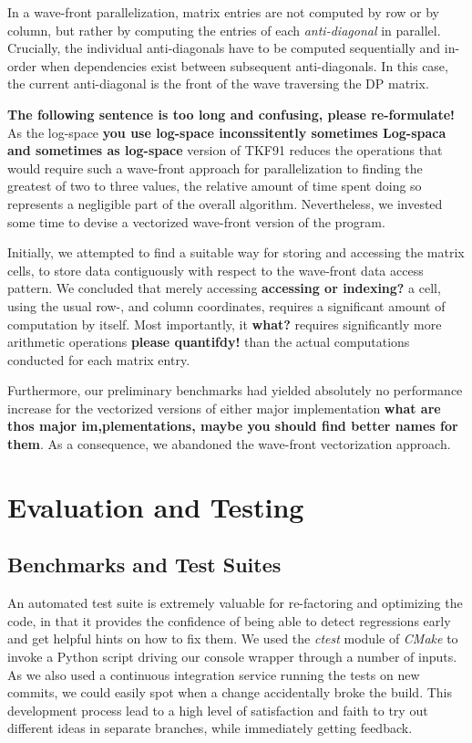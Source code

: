 \documentclass[runningheads,a4paper]{llncs}
\begin{document}
In a wave-front parallelization, matrix entries are not computed by row or by column, but rather by computing the entries of each \textit{anti-diagonal} in parallel. 
Crucially, the individual anti-diagonals have to be computed sequentially and in-order when dependencies exist between subsequent anti-diagonals. 
In this case, the current anti-diagonal is the front of the wave traversing the DP matrix.

{\bf The following sentence is too long and confusing, please re-formulate!} As the log-space {\bf you use log-space inconssitently sometimes Log-spaca and sometimes as log-space} 
version of TKF91 reduces the operations that would require such a wave-front approach for parallelization to finding the greatest of two to three values, 
the relative amount of time spent doing so represents a negligible part of the overall algorithm. 
Nevertheless, we invested some time to devise a vectorized wave-front version of the program.

Initially, we attempted to find a suitable way for storing and accessing the matrix cells, 
to store data contiguously with respect to the wave-front data access pattern. 
We concluded that merely accessing {\bf accessing or indexing?} a cell, using the usual row-, and column coordinates, requires a significant amount of computation by itself. 
Most importantly, it {\bf what?} requires significantly more arithmetic operations {\bf please quantifdy!} than the actual computations conducted for each matrix entry.

Furthermore, our preliminary benchmarks had yielded absolutely no performance increase for the vectorized versions of either major implementation {\bf what are thos major im,plementations, maybe you 
should find better names for them}. 
As a consequence, we abandoned the wave-front vectorization approach.


\section{Evaluation and Testing}
\label{sec:evaluation}

\subsection{Benchmarks and Test Suites}
\label{ssec:benchmark}

An automated test suite is extremely valuable for re-factoring and optimizing the code, in that it provides the confidence of being able to detect regressions early and get helpful hints on how to fix them. We used the \textit{ctest} module of \textit{CMake} to invoke a Python script driving our console wrapper through a number of inputs. As we also used a continuous integration service running the tests on new commits, we could easily spot when a change accidentally broke the build. This development process lead to a high level of satisfaction and faith to try out different ideas in separate branches, while immediately getting feedback.
\end{document}
